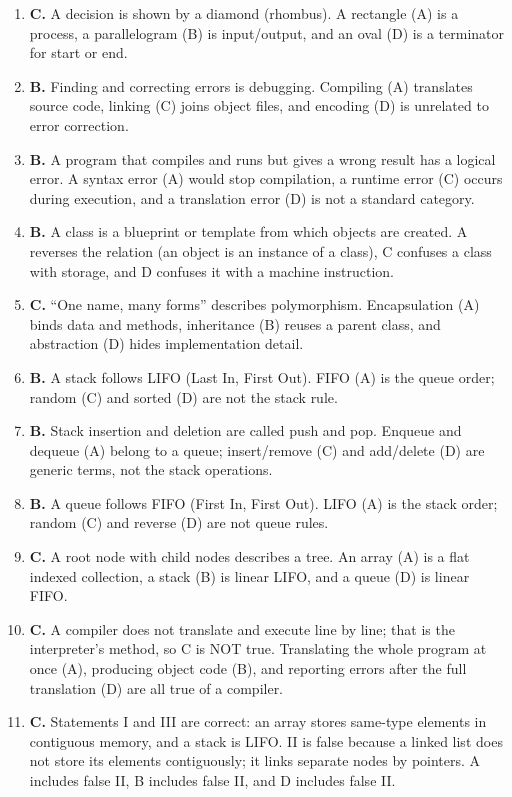 \documentclass[11pt]{article}
\begin{document}
\begin{enumerate}[label=\textbf{Q\arabic*.}, leftmargin=*]
  a debugger.
\item \textbf{C.} A decision is shown by a diamond (rhombus). A rectangle (A)
  is a process, a parallelogram (B) is input/output, and an oval (D) is a
  terminator for start or end.
\item \textbf{B.} Finding and correcting errors is debugging. Compiling (A)
  translates source code, linking (C) joins object files, and encoding (D)
  is unrelated to error correction.
\item \textbf{B.} A program that compiles and runs but gives a wrong result
  has a logical error. A syntax error (A) would stop compilation, a runtime
  error (C) occurs during execution, and a translation error (D) is not a
  standard category.
\item \textbf{B.} A class is a blueprint or template from which objects are
  created. A reverses the relation (an object is an instance of a class), C
  confuses a class with storage, and D confuses it with a machine
  instruction.
\item \textbf{C.} ``One name, many forms'' describes polymorphism.
  Encapsulation (A) binds data and methods, inheritance (B) reuses a parent
  class, and abstraction (D) hides implementation detail.
\item \textbf{B.} A stack follows LIFO (Last In, First Out). FIFO (A) is the
  queue order; random (C) and sorted (D) are not the stack rule.
\item \textbf{B.} Stack insertion and deletion are called push and pop.
  Enqueue and dequeue (A) belong to a queue; insert/remove (C) and
  add/delete (D) are generic terms, not the stack operations.
\item \textbf{B.} A queue follows FIFO (First In, First Out). LIFO (A) is the
  stack order; random (C) and reverse (D) are not queue rules.
\item \textbf{C.} A root node with child nodes describes a tree. An array
  (A) is a flat indexed collection, a stack (B) is linear LIFO, and a queue
  (D) is linear FIFO.
\item \textbf{C.} A compiler does not translate and execute line by line;
  that is the interpreter's method, so C is NOT true. Translating the whole
  program at once (A), producing object code (B), and reporting errors after
  the full translation (D) are all true of a compiler.
\item \textbf{C.} Statements I and III are correct: an array stores same-type
  elements in contiguous memory, and a stack is LIFO. II is false because a
  linked list does not store its elements contiguously; it links separate
  nodes by pointers. A includes false II, B includes false II, and D includes
  false II.


\end{enumerate}
\end{document}
